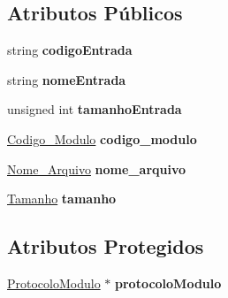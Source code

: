 \subsection*{\-Atributos \-Públicos}
\begin{DoxyCompactItemize}
\item 
\hypertarget{class_cntr_int_modulo_a1eb1b5c91e5b3e28dc0b942df1e3f1f7}{
string {\bfseries codigo\-Entrada}}
\label{class_cntr_int_modulo_a1eb1b5c91e5b3e28dc0b942df1e3f1f7}

\item 
\hypertarget{class_cntr_int_modulo_aff726cb02945c2693475c581d2394aca}{
string {\bfseries nome\-Entrada}}
\label{class_cntr_int_modulo_aff726cb02945c2693475c581d2394aca}

\item 
\hypertarget{class_cntr_int_modulo_a5c90af3779e73cb954659aa7c7dca322}{
unsigned int {\bfseries tamanho\-Entrada}}
\label{class_cntr_int_modulo_a5c90af3779e73cb954659aa7c7dca322}

\item 
\hypertarget{class_cntr_int_modulo_a6def2162909614ff31f6719ee97ac952}{
\hyperlink{class_codigo___modulo}{\-Codigo\-\_\-\-Modulo} {\bfseries codigo\-\_\-modulo}}
\label{class_cntr_int_modulo_a6def2162909614ff31f6719ee97ac952}

\item 
\hypertarget{class_cntr_int_modulo_a94d5c230b0f15f16aa9484924665e1e6}{
\hyperlink{class_nome___arquivo}{\-Nome\-\_\-\-Arquivo} {\bfseries nome\-\_\-arquivo}}
\label{class_cntr_int_modulo_a94d5c230b0f15f16aa9484924665e1e6}

\item 
\hypertarget{class_cntr_int_modulo_a4a54d3d19836141c6c8d9a8fdb8e4777}{
\hyperlink{class_tamanho}{\-Tamanho} {\bfseries tamanho}}
\label{class_cntr_int_modulo_a4a54d3d19836141c6c8d9a8fdb8e4777}

\end{DoxyCompactItemize}
\subsection*{\-Atributos \-Protegidos}
\begin{DoxyCompactItemize}
\item 
\hypertarget{class_cntr_int_modulo_a814c981835b26c196cb0df7c18456485}{
\hyperlink{class_protocolo_modulo}{\-Protocolo\-Modulo} $\ast$ {\bfseries protocolo\-Modulo}}
\label{class_cntr_int_modulo_a814c981835b26c196cb0df7c18456485}

\end{DoxyCompactItemize}


